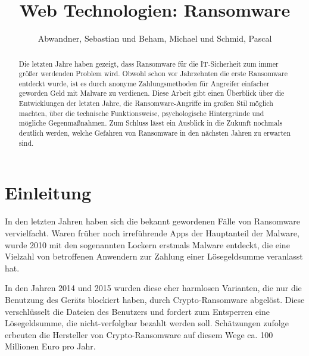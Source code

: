 \documentclass[runningheads,a4paper]{llncs}
\begin{document}


\title{Web Technologien: Ransomware}
{}

\author{Abwandner, Sebastian und Beham, Michael und Schmid, Pascal}
{}


\maketitle

\begin{abstract}
Die letzten Jahre haben gezeigt, dass Ransomware für die IT-Sicherheit zum immer größer werdenden Problem wird. Obwohl schon vor Jahrzehnten die erste Ransomware entdeckt wurde, ist es durch anonyme Zahlungsmethoden für Angreifer einfacher geworden Geld mit Malware zu verdienen. Diese Arbeit gibt einen Überblick über die Entwicklungen der letzten Jahre, die Ransomware-Angriffe im großen Stil möglich machten, über die technische Funktionsweise, psychologische Hintergründe und mögliche Gegenmaßnahmen. Zum Schluss lässt ein Ausblick in die Zukunft nochmals deutlich werden, welche Gefahren von Ransomware in den nächsten Jahren zu erwarten sind.
\end{abstract}

\section{Einleitung}\label{sec:intro}
In den letzten Jahren haben sich die bekannt gewordenen Fälle von Ransomware vervielfacht. Waren früher noch irreführende Apps der Hauptanteil der Malware, wurde 2010 mit den sogenannten Lockern erstmals Malware entdeckt, die eine Vielzahl von betroffenen Anwendern zur Zahlung einer Lösegeldsumme veranlasst hat. \cite{bsi:ransome2}

In den Jahren 2014 und 2015 wurden diese eher harmlosen Varianten, die nur die Benutzung des Geräts blockiert haben, durch Crypto-Ransomware abgelöst. Diese verschlüsselt die Dateien des Benutzers und fordert zum Entsperren eine Lösegeldsumme, die nicht-verfolgbar bezahlt werden soll. Schätzungen zufolge erbeuten die Hersteller von Crypto-Ransomware auf diesem Wege ca. 100 Millionen Euro pro Jahr. \cite{money}
\end{document}
